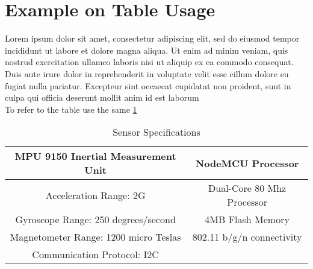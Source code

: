 \section{Example on Table Usage}

Lorem ipsum dolor sit amet, consectetur adipiscing elit, sed do eiusmod tempor incididunt ut labore et dolore magna aliqua. Ut enim ad minim veniam, quis nostrud exercitation ullamco laboris nisi ut aliquip ex ea commodo consequat. Duis aute irure dolor in reprehenderit in voluptate velit esse cillum dolore eu fugiat nulla pariatur. Excepteur sint occaecat cupidatat non proident, sunt in culpa qui officia deserunt mollit anim id est laborum
\\
To refer to the table use the same \ref{table:Spec}

\begin{table}[h!]
\centering
\begin{tabular}{||c c||} 
 \hline
 MPU 9150 Inertial Measurement Unit & NodeMCU Processor \\ [0.5ex] 
 \hline\hline
 Acceleration Range: 2G & Dual-Core 80 Mhz Processor \\ 
 Gyroscope Range: 250 degrees/second  & 4MB Flash Memory \\
 Magnetometer Range: 1200 micro Teslas & 802.11 b/g/n connectivity \\
 Communication Protocol: I2C & \\[1ex] 
 \hline
\end{tabular}
\caption{Sensor Specifications}
\label{table:Spec}
\end{table}